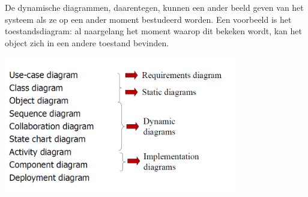 De dynamische diagrammen, daarentegen, kunnen een ander beeld geven van het systeem als ze op een ander moment bestudeerd worden. Een voorbeeld is het toestandsdiagram: al naargelang het moment waarop dit bekeken wordt, kan het object zich in een andere toestand bevinden.

\begin{center}
\includegraphics[width=4in]{img/overviewumllen}%
\end{center}

